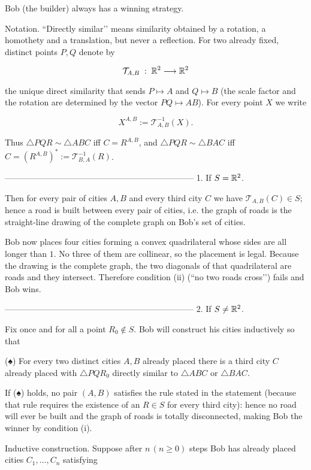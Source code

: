 Bob (the builder) always has a winning strategy.

Notation.  “Directly similar’’ means similarity obtained by a rotation, a homothety and a translation, but never a reflection.  
For two already fixed, distinct points \(P,Q\) denote by  

\[
\mathcal T_{A,B}\; :\; \Bbb R^{2}\longrightarrow\Bbb R^{2}
\]

the unique direct similarity that sends \(P\mapsto A\) and \(Q\mapsto B\)
(the scale factor and the rotation are determined by the vector \(PQ\mapsto AB\)).
For every point \(X\) we write  

\[
X^{A,B}:=\mathcal T_{A,B}^{-1}(X).
\]

Thus \( \triangle PQR\sim\triangle ABC\)  iff \(C=R^{A,B}\), and   
\( \triangle PQR\sim\triangle BAC\)  iff \(C=(R^{A,B})^{\!*}:=
\mathcal T_{B,A}^{-1}(R)\).

--------------------------------------------------------------------
1.  If  \(S=\Bbb R^{2}\).

Then for every pair of cities \(A,B\) and every third city \(C\) we have
\(\mathcal T_{A,B}(C)\in S\); hence a road is built between every
pair of cities, i.e. the graph of roads is the straight-line drawing of the
complete graph on Bob’s set of cities.

Bob now places four cities forming a convex
quadrilateral whose sides are all longer than \(1\).
No three of them are collinear, so the placement is legal.
Because the drawing is the complete graph,
the two diagonals of that quadrilateral are roads and they intersect.
Therefore condition (ii) (“no two roads cross’’) fails and Bob wins.

--------------------------------------------------------------------
2.  If  \(S\neq\Bbb R^{2}\).

Fix once and for all a point \(R_{0}\notin S\).
Bob will construct his cities inductively so that

(♠)  For every two distinct cities \(A,B\) already placed there is  
a third city \(C\) already placed with
\(\triangle PQR_{0}\) directly similar to \(\triangle ABC\) or \(\triangle BAC\).

If (♠) holds, no pair \((A,B)\) satisfies the rule stated in the
statement (because that rule requires the existence of an \(R\in S\) for
every third city): hence no road will ever be built and the graph of roads
is totally disconnected, making Bob the winner by condition (i).

Inductive construction.  
Suppose after \(n\,(n\ge 0)\) steps Bob has already placed
cities \(C_{1},\dots ,C_{n}\) satisfying

